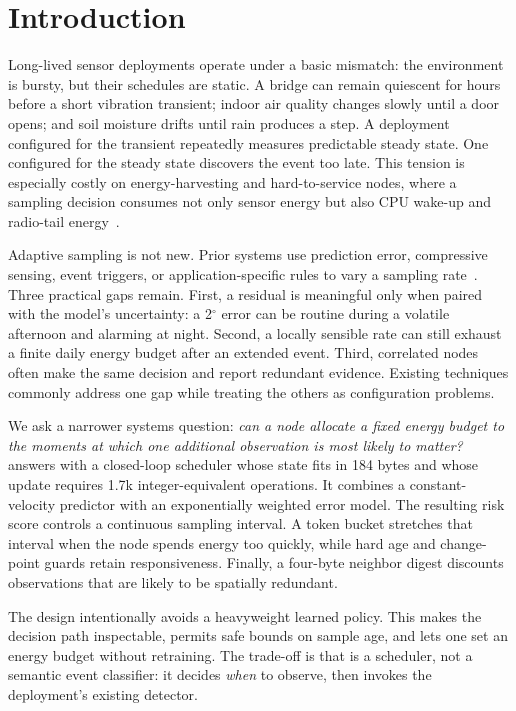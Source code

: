 \section{Introduction}
\label{sec:introduction}

Long-lived sensor deployments operate under a basic mismatch: the environment
is bursty, but their schedules are static.  A bridge can remain quiescent for
hours before a short vibration transient; indoor air quality changes slowly
until a door opens; and soil moisture drifts until rain produces a step.  A
deployment configured for the transient repeatedly measures predictable steady
state.  One configured for the steady state discovers the event too late.
This tension is especially costly on energy-harvesting and hard-to-service
nodes, where a sampling decision consumes not only sensor energy but also CPU
wake-up and radio-tail energy~\cite{lorincz2004sensor,lin2010energy}.

Adaptive sampling is not new.  Prior systems use prediction error, compressive
sensing, event triggers, or application-specific rules to vary a sampling
rate~\cite{deshpande2004model,raghunathan2006energyscavenging,jain2004duality,lu2010smart}.  Three practical gaps remain.  First, a residual is meaningful only when paired with the model's uncertainty: a
2$^\circ$ error can be routine during a volatile afternoon and alarming at
night.  Second, a locally sensible rate can still exhaust a finite daily energy
budget after an extended event.  Third, correlated nodes often make the same
decision and report redundant evidence.  Existing techniques commonly address
one gap while treating the others as configuration problems.

We ask a narrower systems question: \emph{can a node allocate a fixed energy
budget to the moments at which one additional observation is most likely to
matter?}  \system answers with a closed-loop scheduler whose state fits in 184
bytes and whose update requires 1.7k integer-equivalent operations.  It
combines a constant-velocity predictor with an exponentially weighted error
model.  The resulting risk score controls a continuous sampling interval.  A
token bucket stretches that interval when the node spends energy too quickly,
while hard age and change-point guards retain responsiveness.  Finally, a
four-byte neighbor digest discounts observations that are likely to be
spatially redundant.

The design intentionally avoids a heavyweight learned policy.  This makes the
decision path inspectable, permits safe bounds on sample age, and lets one set
an energy budget without retraining.  The trade-off is that \system is a
scheduler, not a semantic event classifier: it decides \emph{when} to observe,
then invokes the deployment's existing detector.

